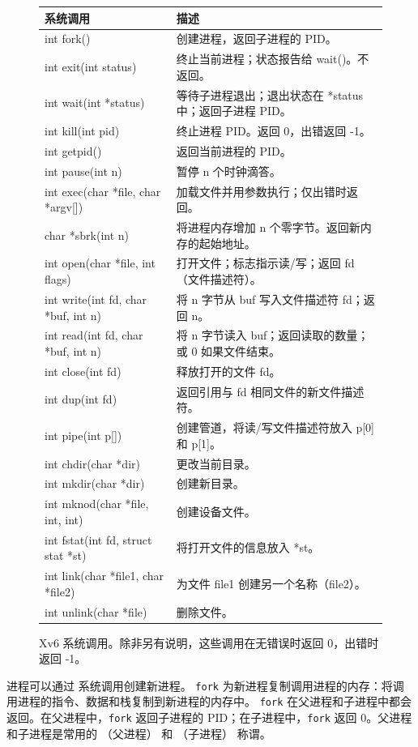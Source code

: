 \begin{figure}[t]
\centering
\begin{tabular}{ll}
{\bf 系统调用} & {\bf 描述} \\
\midrule
int fork() & 创建进程，返回子进程的 PID。 \\
int exit(int status) & 终止当前进程；状态报告给 wait()。不返回。 \\
int wait(int *status) & 等待子进程退出；退出状态在 *status 中；返回子进程 PID。 \\
int kill(int pid) & 终止进程 PID。返回 0，出错返回 -1。 \\
int getpid() & 返回当前进程的 PID。 \\
int pause(int n) & 暂停 n 个时钟滴答。 \\
int exec(char *file, char *argv[]) & 加载文件并用参数执行；仅出错时返回。 \\
char *sbrk(int n) & 将进程内存增加 n 个零字节。返回新内存的起始地址。 \\
int open(char *file, int flags) & 打开文件；标志指示读/写；返回 fd（文件描述符）。 \\
int write(int fd, char *buf, int n) & 将 n 字节从 buf 写入文件描述符 fd；返回 n。 \\
int read(int fd, char *buf, int n) & 将 n 字节读入 buf；返回读取的数量；或 0 如果文件结束。 \\
int close(int fd) & 释放打开的文件 fd。 \\
int dup(int fd) & 返回引用与 fd 相同文件的新文件描述符。\\
int pipe(int p[]) & 创建管道，将读/写文件描述符放入 p[0] 和 p[1]。 \\
int chdir(char *dir) & 更改当前目录。 \\
int mkdir(char *dir) & 创建新目录。 \\
int mknod(char *file, int, int) & 创建设备文件。 \\
int fstat(int fd, struct stat *st) & 将打开文件的信息放入 *st。 \\
int link(char *file1, char *file2) & 为文件 file1 创建另一个名称（file2）。 \\
int unlink(char *file) & 删除文件。 \\
\end{tabular}
\caption{Xv6 系统调用。除非另有说明，这些调用在无错误时返回 0，出错时返回 -1。}
\label{fig:api}
\end{figure}

进程可以通过
系统调用创建新进程。
\lstinline{fork}
为新进程复制调用进程的内存：将调用进程的指令、数据和栈复制到新进程的内存中。
\lstinline{fork}
在父进程和子进程中都会返回。在父进程中，\lstinline{fork} 返回子进程的 PID；在子进程中，\lstinline{fork} 返回 0。父进程和子进程是常用的
（父进程）
和
（子进程）
称谓。


